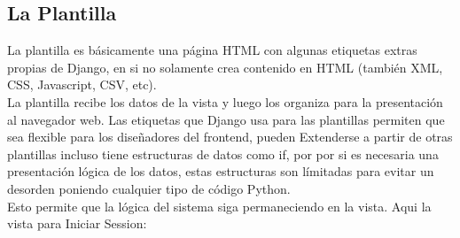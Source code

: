 \subsection{La Plantilla}
La plantilla es básicamente una página HTML con algunas etiquetas extras
propias de Django, en si no solamente crea contenido en HTML (también XML, CSS,
Javascript, CSV, etc).\\[0.1cm]

La plantilla recibe los datos de la vista y luego los organiza para la
presentación al navegador web. Las etiquetas que Django usa para las plantillas
permiten que sea flexible para los
diseñadores del frontend, pueden Extenderse a partir de otras plantillas incluso
tiene estructuras de datos como if, por por si es necesaria una presentación
lógica de los datos, estas estructuras
son límitadas para evitar un desorden poniendo cualquier tipo de código Python.\\[0.1cm]

Esto permite que la lógica del sistema siga permaneciendo en la vista. Aqui la
vista para Iniciar Session:\\[0.1cm]

